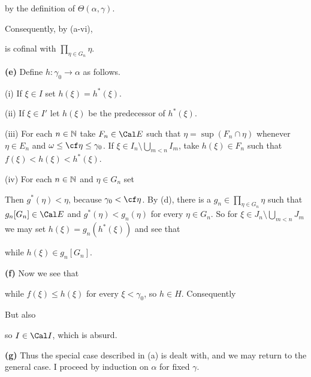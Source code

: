 {\noindent by the definition of $\Theta(\alpha,\gamma)$.\ \Qed

Consequently, by (a-vi),


\noindent is cofinal with $\prod_{\eta\in G_n}\eta$.

\medskip

{\bf (e)} Define $h:\gamma_0\to\alpha$ as follows.

\quad(i) If $\xi\in I$ set $h(\xi)=h^*(\xi)$.

\quad(ii) If $\xi\in I'$ let $h(\xi)$ be the predecessor of
$h^*(\xi)$.

\quad(iii) For each $n\in\Bbb N$ take $F_n\in\Cal E$
such that $\eta=\sup(F_n\cap\eta)$ whenever $\eta\in E_n$ and
$\omega\le\cf\eta\le\gamma_0$.   If
$\xi\in I_n\setminus\bigcup_{m<n}I_m$, take $h(\xi)\in F_n$ such that
$f(\xi)<h(\xi)<h^*(\xi)$.

\quad(iv) For each $n\in\Bbb N$ and $\eta\in G_n$ set


\noindent Then $g^*(\eta)<\eta$, because $\gamma_0<\cf\eta$.   By
(d), there is a $g_n\in\prod_{\eta\in G_n}\eta$ such that
$g_n[G_n]\in\Cal E$
and $g^*(\eta)<g_n(\eta)$ for every $\eta\in G_n$.   So for
$\xi\in J_n\setminus\bigcup_{m<n}J_m$ we may set
$h(\xi)=g_n(h^*(\xi))$
and see that


\noindent while $h(\xi)\in g_n[G_n]$.

\medskip

{\bf (f)} Now we see that


\noindent while $f(\xi)\le h(\xi)$ for every $\xi<\gamma_0$, so
$h\in H$.   Consequently


\noindent But also


\noindent so $I\in\Cal I$, which is absurd.  \Bang

\medskip

{\bf (g)} Thus the special case described in (a) is dealt with, and we
may return to the general case.   I proceed by induction on $\alpha$
for fixed $\gamma$.

}
